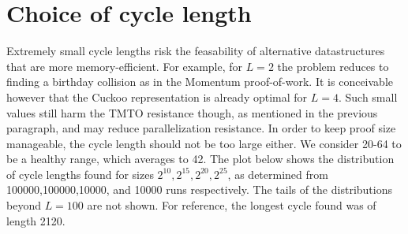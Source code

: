 \documentclass[11pt, oneside]{article}
\begin{document}
\section{Choice of cycle length}
Extremely small cycle lengths risk the feasability of alternative datastructures that
are more memory-efficient. For example, for $L=2$ the problem reduces to finding a birthday collision
as in the Momentum proof-of-work.
It is conceivable however that the Cuckoo representation is already optimal for $L=4$.
Such small values still harm the TMTO resistance though, as mentioned in the previous paragraph,
and may reduce parallelization resistance.
In order to keep proof size manageable, the cycle length should not be too large either.
We consider 20-64 to be a healthy range, which averages to 42.
The plot below shows the distribution of cycle lengths found for sizes $2^{10},2^{15},2^{20},2^{25}$,
as determined from 100000,100000,10000, and 10000 runs respectively. The tails of the distributions
beyond $L=100$ are not shown. For reference, the longest cycle found was of length 2120.
\end{document}
